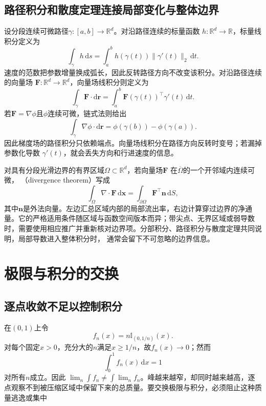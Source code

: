 \subsection{路径积分和散度定理连接局部变化与整体边界}

设分段连续可微路径$\gamma:[a,b]\to\mathbb{R}^d$。对沿路径连续的标量函数
$h:\mathbb{R}^d\to\mathbb{R}$，标量线积分定义为
\[
  \int_\gamma h\,\mathrm{d}s
  =
  \int_a^b h(\gamma(t))\lVert\gamma'(t)\rVert_2\,\mathrm{d}t.
\]
速度的范数把参数增量换成弧长，因此反转路径方向不改变该积分。对沿路径连续的向量场
$\bm{F}:\mathbb{R}^d\to\mathbb{R}^d$，向量场线积分则定义为
\[   \int_{\gamma}\bm{F}\mathbin{\cdot}\mathrm{d}\bm{r}   =   \int_a^b   \bm{F}(\gamma(t))^{\top}\gamma'(t)\,\mathrm{d}t. \]
若$\bm{F}=\nabla\phi$且$\phi$连续可微，链式法则给出
\begin{equation}
  \int_{\gamma}\nabla\phi\mathbin{\cdot}\mathrm{d}\bm{r}
  =
  \phi(\gamma(b))-\phi(\gamma(a)).
\label{eq:analysis-line-integral-gradient}
\end{equation}
因此梯度场的路径积分只依赖端点。向量场线积分在路径方向反转时变号；若漏掉参数化导数
$\gamma'(t)$，就会丢失方向和行进速度的信息。

对具有分段光滑边界的有界区域$\Omega\subset\mathbb{R}^d$，若向量场$\bm{F}$
在$\overline{\Omega}$的一个开邻域内连续可微，
（divergence theorem）写成
\begin{equation}
  \int_{\Omega}\nabla\mathbin{\cdot}\bm{F}\,\mathrm{d}\bm{x}
  =
  \int_{\partial\Omega}\bm{F}^{\top}\bm{n}\,\mathrm{d}S,
\label{eq:analysis-divergence-theorem}
\end{equation}
其中$\bm{n}$是外法向量。左边汇总区域内部的局部流出率，右边计算穿过边界的净通量。它的严格适用条件随区域与函数空间版本而异；带尖点、无界区域或弱导数时，需要使用相应推广并重新核对边界项。分部积分、路径积分与散度定理共同说明，局部导数进入整体积分时， 通常会留下不可忽略的边界信息。
\section{极限与积分的交换}
\label{sec:analysis-limit-integral-interchange}
\subsection{逐点收敛不足以控制积分}

在$(0,1)$上令
\[   f_n(x)=n\mathbb{I}_{(0,1/n)}(x). \]
对每个固定$x>0$，充分大的$n$满足$x\geq1/n$，故$f_n(x)\to0$；然而
\[   \int_0^1f_n(x)\,\mathrm{d}x=1 \]
对所有$n$成立。因此 $\lim_n\int f_n\neq\int\lim_n f_n$。峰越来越窄，却同时越来越高，逐点观察不到被压缩区域中保留下来的总质量。要交换极限与积分，必须阻止这种质量逃逸或集中

